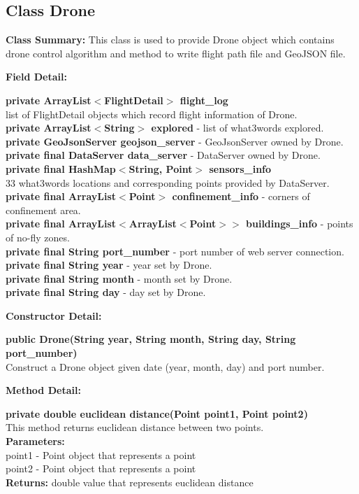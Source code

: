 \documentclass[12pt]{article}
\begin{document}
\subsection {Class Drone}
\textbf{Class Summary:} This class is used to provide Drone object which contains drone control algorithm and method to write flight path file and GeoJSON file.

\textbf{Field Detail:}

\textbf{private ArrayList$<$FlightDetail$>$ flight\_log}\\
list of FlightDetail objects which record flight information of Drone.\\
\textbf{private ArrayList$<$String$>$ explored} - list of what3words explored.\\
\textbf{private GeoJsonServer geojson\_server} - GeoJsonServer owned by Drone.\\
\textbf{private final DataServer data\_server} - DataServer owned by Drone.\\
\textbf{private final HashMap$<$String, Point$>$ sensors\_info}\\
33 what3words locations and corresponding points provided by DataServer.\\
\textbf{private final ArrayList$<$Point$>$ confinement\_info} - corners of confinement area.\\
\textbf{private final ArrayList$<$ArrayList$<$Point$>>$ buildings\_info} - points of no-fly zones.\\
\textbf{private final String port\_number} - port number of web server connection.\\
\textbf{private final String year} - year set by Drone.\\
\textbf{private final String month} - month set by Drone.\\
\textbf{private final String day} - day set by Drone.

\textbf{Constructor Detail:}

\textbf{public Drone(String year, String month, String day, String port\_number)}\\
Construct a Drone object given date (year, month, day) and port number.

\textbf{Method Detail:}

\textbf{private double euclidean distance(Point point1, Point point2)}\\
This method returns euclidean distance between two points.\\
\textbf{Parameters:}\\
point1 - Point object that represents a point\\
point2 - Point object that represents a point\\
\textbf{Returns:} double value that represents euclidean distance
\end{document}
